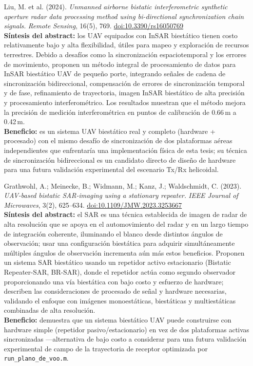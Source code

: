 \documentclass[11pt,a4paper]{article}
\begin{document}
\begin{enumerate}[label=\textbf{[D\arabic*]}, leftmargin=2.2cm, itemsep=10pt]

\item Liu, M. et al. (2024). \textit{Unmanned airborne bistatic
interferometric synthetic aperture radar data processing method using
bi-directional synchronization chain signals.} \emph{Remote Sensing},
16(5), 769. \href{https://doi.org/10.3390/rs16050769}{doi:10.3390/rs16050769}
\cite{liu2024}\\
\textbf{Síntesis del abstract:} los UAV equipados con InSAR biestático
tienen costo relativamente bajo y alta flexibilidad, útiles para mapeo y
exploración de recursos terrestres. Debido a desafíos como la
sincronización espaciotemporal y los errores de movimiento, proponen un
método integral de procesamiento de datos para InSAR biestático UAV de
pequeño porte, integrando señales de cadena de sincronización
bidireccional, compensación de errores de sincronización temporal y de
fase, refinamiento de trayectoria, imagen InSAR biestático de alta
precisión y procesamiento interferométrico. Los resultados muestran que el
método mejora la precisión de medición interferométrica en puntos de
calibración de 0.66\,m a 0.42\,m.\\
\textbf{Beneficio:} es un sistema UAV biestático real y completo (hardware
+ procesado) con el mismo desafío de sincronización de dos plataformas
aéreas independientes que enfrentaría una implementación física de esta
tesis; su técnica de sincronización bidireccional es un candidato directo
de diseño de hardware para una futura validación experimental del
escenario Tx/Rx helicoidal.

\item Grathwohl, A.; Meinecke, B.; Widmann, M.; Kanz, J.; Waldschmidt, C.
(2023). \textit{UAV-based bistatic SAR-imaging using a stationary
repeater.} \emph{IEEE Journal of Microwaves}, 3(2), 625--634.
\href{https://doi.org/10.1109/JMW.2023.3253667}{doi:10.1109/JMW.2023.3253667}
\cite{grathwohl2023}\\
\textbf{Síntesis del abstract:} el SAR es una técnica establecida de imagen
de radar de alta resolución que se apoya en el automovimiento del radar y
en un largo tiempo de integración coherente, iluminando el blanco desde
distintos ángulos de observación; usar una configuración biestática para
adquirir simultáneamente múltiples ángulos de observación incrementa aún
más estos beneficios. Proponen un sistema SAR biestático usando un
repetidor activo estacionario (Bistatic Repeater-SAR, BR-SAR), donde el
repetidor actúa como segundo observador proporcionando una vía biestática
con bajo costo y esfuerzo de hardware; describen las consideraciones de
procesado de señal y hardware necesarias, validando el enfoque con
imágenes monoestáticas, biestáticas y multiestáticas combinadas de alta
resolución.\\
\textbf{Beneficio:} demuestra que un sistema biestático UAV puede
construirse con hardware simple (repetidor pasivo/estacionario) en vez de
dos plataformas activas sincronizadas —alternativa de bajo costo a
considerar para una futura validación experimental de campo de la
trayectoria de receptor optimizada por \texttt{run\_plano\_de\_voo.m}.


\end{enumerate}
\end{document}
